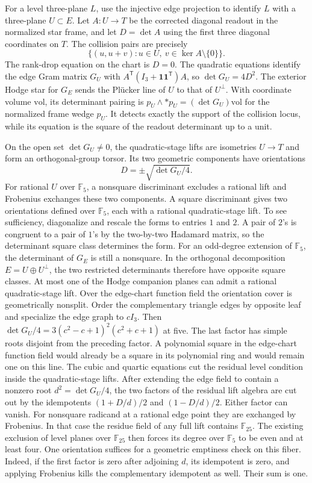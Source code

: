For a level three-plane \(L\), use the injective edge projection to
identify \(L\) with a three-plane \(U\subset E\). Let \(A:U\to T\)
be the corrected diagonal readout in the normalized star frame, and
let \(D=\det A\) using the first three diagonal coordinates on \(T\).
The collision pairs are precisely
\[
 \bigl\{(u,u+v):u\in U,\ v\in\ker A\setminus\{0\}\bigr\}.
\]
The rank-drop equation on the chart is \(D=0\). The quadratic
equations identify the edge Gram matrix \(G_U\) with
\(A^{\mathsf T}(I_3+\mathbf 1\mathbf 1^{\mathsf T})A\), so
\(\det G_U=4D^2\). The exterior Hodge star for \(G_E\) sends the
Pl\"ucker line of \(U\) to that of \(U^\perp\). With coordinate volume
\(\mathrm{vol}\), its determinant pairing is
\(p_U\wedge *p_U=(\det G_U)\mathrm{vol}\) for the normalized frame
wedge \(p_U\). It detects exactly the support of the collision locus,
while its equation is the square of the readout determinant up to a unit.

On the open set \(\det G_U\ne0\), the quadratic-stage lifts are
isometries \(U\to T\) and form an orthogonal-group torsor. Its two
geometric components have orientations
\[
 D=\pm\sqrt{\det G_U/4}.
\]
For rational \(U\) over \(\mathbb F_5\), a nonsquare discriminant
excludes a rational lift and Frobenius exchanges these two components.
A square discriminant gives two orientations defined over \(\mathbb F_5\),
each with a rational quadratic-stage lift. To see sufficiency,
diagonalize and rescale the forms to entries \(1\) and \(2\). A pair
of \(2\)'s is congruent to a pair of \(1\)'s by the two-by-two Hadamard
matrix, so the determinant square class determines the form.
For an odd-degree extension of \(\mathbb F_5\), the determinant
of \(G_E\) is still a nonsquare. In the orthogonal decomposition
\(E=U\oplus U^\perp\), the two restricted determinants therefore
have opposite square classes. At most one of the Hodge companion
planes can admit a rational quadratic-stage lift.
Over the edge-chart function field the orientation cover is
geometrically nonsplit. Order the complementary triangle edges by
opposite leaf and specialize the edge graph to \(cI_3\).
Then \(\det G_U/4=3(c^2-c+1)^2(c^2+c+1)\) at five. The last
factor has simple roots disjoint from the preceding factor.
A polynomial square in the edge-chart function field would already
be a square in its polynomial ring and would remain one on this line.
The cubic and quartic equations cut the residual level condition
inside the quadratic-stage lifts.
After extending the edge field to contain a nonzero root
\(d^2=\det G_U/4\), the two factors of the residual lift algebra
are cut out by the idempotents \((1+D/d)/2\) and \((1-D/d)/2\).
Either factor can vanish. For nonsquare radicand at a rational
edge point they are exchanged by Frobenius.
In that case the residue field of any full lift contains
\(\mathbb F_{25}\). The existing exclusion of level planes over
\(\mathbb F_{25}\) then forces its degree over \(\mathbb F_5\)
to be even and at least four. One orientation suffices for a
geometric emptiness check on this fiber. Indeed, if the first
factor is zero after adjoining \(d\), its idempotent is zero,
and applying Frobenius kills the complementary idempotent as
well. Their sum is one.

